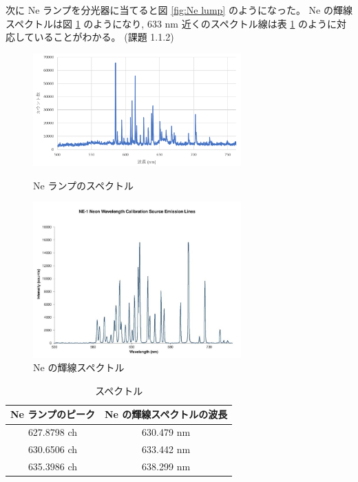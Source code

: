 \documentclass[uplatex,dvipdfmx,a4paper,11pt]{jlreq}
\numberwithin{equation}{section}
\theoremstyle{definition}
\begin{document}
次に Ne ランプを分光器に当てると図 \ref{fig:Ne lump} のようになった。
Ne の輝線スペクトルは図 \ref{fig:Ne spectre} のようになり, 633 \si{nm} 近くのスペクトル線は表 \ref{table:spectre} のように対応していることがわかる。
(課題 1.1.2) \\
\begin{figure}[htbp]
  \begin{minipage}[b]{0.5\linewidth}
    \centering
    \includegraphics[width=8cm]{./assets/ne_lump.png}
    \caption{Ne ランプのスペクトル}
    \label{fig:Ne lump}
  \end{minipage}
  \begin{minipage}[b]{0.5\linewidth}
    \centering
    \includegraphics[width=8cm]{./assets/Neon-Calibration.jpg}
    \caption{Ne の輝線スペクトル}
    \label{fig:Ne spectre}
  \end{minipage}
\end{figure}
\begin{table}
  \centering
  \begin{tabular}{|c|c|}
    \hline
    Ne ランプのピーク  & Ne の輝線スペクトルの波長 \\
    \hline \hline
    627.8798 ch & 630.479 nm     \\
    630.6506 ch & 633.442 nm     \\
    635.3986 ch & 638.299 nm     \\
    \hline
  \end{tabular}
  \caption{スペクトル}
  \label{table:spectre}
\end{table}
\end{document}
